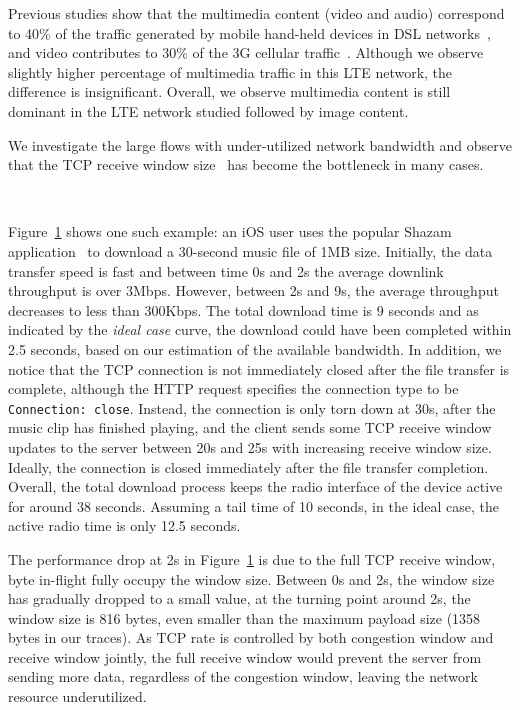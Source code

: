 Previous studies show that the multimedia content (video and audio) correspond to 40\% of the traffic generated by mobile hand-held devices in DSL networks~\cite{maier10}, and video contributes to 30\% of the 3G cellular traffic~\cite{erman11}. Although we observe slightly higher percentage of multimedia traffic in this LTE network, the difference is insignificant. Overall, we observe multimedia content is still dominant in the LTE network studied followed by image content.



We investigate the large flows with under-utilized network bandwidth and observe that the TCP receive window size~\cite{rfc1323} has become the bottleneck in many cases.

\begin{figure}[t]
\centering
{}\\
\label{fig:shazam}
\end{figure}

Figure~\ref{fig:shazam} shows one such example: an iOS user uses the popular Shazam application~\cite{shazam} to download a 30-second music file of 1MB size. Initially, the data transfer speed is fast and between time 0s and 2s the average downlink throughput is over 3Mbps. However, between 2s and 9s, the average throughput decreases to less than 300Kbps. The total download time is 9 seconds and as indicated by the \emph{ideal case} curve, the download could have been completed within 2.5 seconds, based on our estimation of the available bandwidth. In addition, we notice that the TCP connection is not immediately closed after the file transfer is complete, although the HTTP request specifies the connection type to be \texttt{Connection: close}. Instead, the connection is only torn down at 30s, after the music clip has finished playing, and the client sends some TCP receive window updates to the server between 20s and 25s with increasing receive window size. Ideally, the connection is closed immediately after the file transfer completion. Overall, the total download process keeps the radio interface of the device active for around 38 seconds. Assuming a tail time of 10 seconds, in the ideal case, the active radio time is only 12.5 seconds.

The performance drop at 2s in Figure~\ref{fig:shazam} is due to the full TCP receive window, \ie byte in-flight fully occupy the window size. Between 0s and 2s, the window size has gradually dropped to a small value, \eg at the turning point around 2s, the window size is 816 bytes, even smaller than the maximum payload size  (1358 bytes in our traces). As TCP rate is controlled by both congestion window and receive window jointly, the full receive window would prevent the server from sending more data, regardless of the congestion window, leaving the network resource underutilized.

